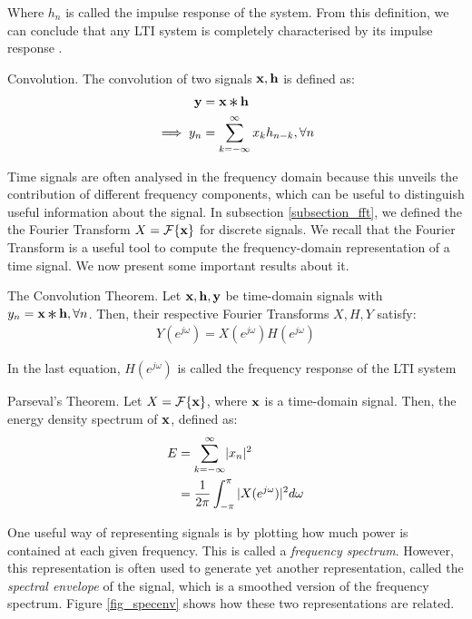 \documentclass[../main.tex]{subfiles}
\begin{document}
\par Where $h_{n}$ is called the impulse response of the system. From this definition, we can conclude that any LTI system is completely characterised by its impulse response \cite{Oppenheim2010}.  
\begin{definition}{Convolution.} \label{def_convolution}
The convolution of two signals $\mathbf{x, h}$ is defined as:
\begin{align*}
\V{y} &= \V{x} \Conv \V{h}\\
\implies y_n &= \sum_{k=-\infty}^{\infty}x_kh_{n-k}, \forall n
\end{align*}
\end{definition}
\par Time signals are often analysed in the frequency domain because this unveils the contribution of different frequency components, which can be useful to distinguish useful information about the signal. In subsection \ref{subsection_fft}, we defined the the Fourier Transform $X = \mathcal{F}\{\mathbf{x}\}$ for discrete signals. We recall that the Fourier Transform is a useful tool to compute the frequency-domain representation of a time signal. We now present some important results about it.
\begin{theorem}{The Convolution Theorem.} \label{theo_conv}
Let $\mathbf{x, h, y}$ be time-domain signals with $y_n = \V{x}\Conv\V{h}, \forall n$. Then, their respective Fourier Transforms $X, H, Y$ satisfy:
\begin{align*}
Y(e^{j\omega}) = X(e^{j\omega})H(e^{j\omega})
\end{align*}
\end{theorem}
\par In the last equation, $H(e^{j\omega})$ is called the frequency response of the LTI system
\begin{theorem}{Parseval's Theorem.} \label{theo_parseval}
Let $X = \mathcal{F}\{\mathbf{x}\}$, where $\mathbf{x}$ is a time-domain signal. Then, the energy density spectrum of $\mathbf{x}$, defined as:
\begin{align*}
E &= \sum_{k=-\infty}^{\infty}\lvert x_n\rvert^2\\
&= \frac{1}{2\pi}\int_{-\pi}^\pi{\lvert X(e^{j\omega})\rvert^2d\omega}
\end{align*}
\end{theorem}
\par One useful way of representing signals is by plotting how much power is contained at each given frequency. This is called a \emph{frequency spectrum}. However, this representation is often used to generate yet another representation, called the \emph{spectral envelope} of the signal, which is a smoothed version of the frequency spectrum. Figure \ref{fig_specenv} shows how these two representations are related.
\end{document}
